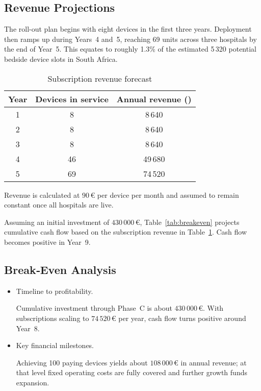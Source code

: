 \documentclass[a4paper,11pt]{article}
\begin{document}
\subsection{Revenue Projections}
The roll-out plan begins with eight devices in the first three years. Deployment then ramps up during Years~4 and~5, reaching 69 units across three hospitals by the end of Year~5. This equates to roughly 1.3\% of the estimated 5\,320 potential bedside device slots in South Africa.

\begin{table}[H]
\centering
\caption{Subscription revenue forecast}
\label{tab:revenue}
\begin{tabularx}{\linewidth}{c c c}
\toprule
Year & Devices in service & Annual revenue (\texteuro{}) \\
\midrule
1 & 8 & 8\,640 \\
2 & 8 & 8\,640 \\
3 & 8 & 8\,640 \\
4 & 46 & 49\,680 \\
5 & 69 & 74\,520 \\
\bottomrule
\end{tabularx}
\end{table}

Revenue is calculated at \(90\,\text{€}\) per device per month and assumed to remain constant once all hospitals are live.

Assuming an initial investment of \(430\,000\,\text{€}\), Table~\ref{tab:breakeven} projects cumulative cash flow based on the subscription revenue in Table~\ref{tab:revenue}. Cash flow becomes positive in Year~9.


\subsection{Break‐Even Analysis}
\begin{itemize}
  \item Timeline to profitability. 
  
  Cumulative investment through Phase~C is about \(430\,000\,\text{€}\). With subscriptions scaling to \(74\,520\,\text{€}\) per year, cash flow turns positive around Year~8.
  \item Key financial milestones. 
  
  Achieving 100 paying devices yields about \(108\,000\,\text{€}\) in annual revenue; at that level fixed operating costs are fully covered and further growth funds expansion.
\end{itemize}
\end{document}
